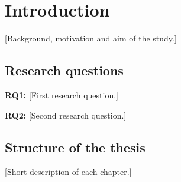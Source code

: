 \chapter{Introduction}\label{ch:introduction}

[Background, motivation and aim of the study.]

\section{Research questions}\label{sec:rqs}

\textbf{RQ1:} [First research question.]

\textbf{RQ2:} [Second research question.]

\section{Structure of the thesis}

[Short description of each chapter.]
